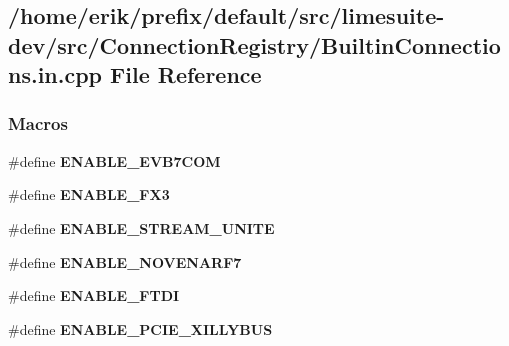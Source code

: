 \subsection{/home/erik/prefix/default/src/limesuite-\/dev/src/\+Connection\+Registry/\+Builtin\+Connections.in.\+cpp File Reference}
\label{BuiltinConnections_8in_8cpp}
\subsubsection*{Macros}
\begin{DoxyCompactItemize}
\item 
\#define {\bf E\+N\+A\+B\+L\+E\+\_\+\+E\+V\+B7\+C\+OM}
\item 
\#define {\bf E\+N\+A\+B\+L\+E\+\_\+\+F\+X3}
\item 
\#define {\bf E\+N\+A\+B\+L\+E\+\_\+\+S\+T\+R\+E\+A\+M\+\_\+\+U\+N\+I\+TE}
\item 
\#define {\bf E\+N\+A\+B\+L\+E\+\_\+\+N\+O\+V\+E\+N\+A\+R\+F7}
\item 
\#define {\bf E\+N\+A\+B\+L\+E\+\_\+\+F\+T\+DI}
\item 
\#define {\bf E\+N\+A\+B\+L\+E\+\_\+\+P\+C\+I\+E\+\_\+\+X\+I\+L\+L\+Y\+B\+US}
\end{DoxyCompactItemize}

